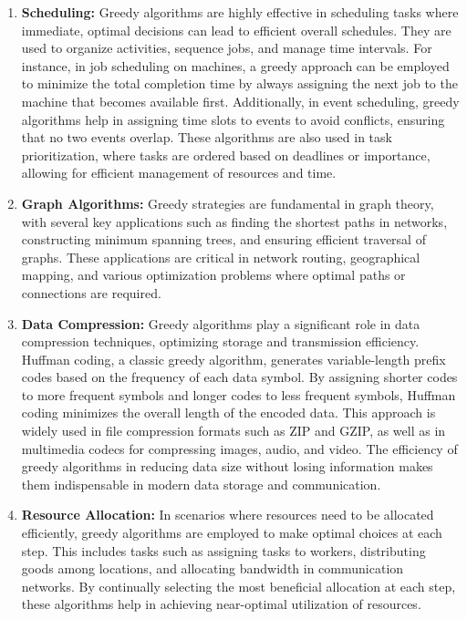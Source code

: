 \documentclass[
]{article}
\begin{document}
    \begin{enumerate}
        \item \textbf{Scheduling:} Greedy algorithms are highly effective in scheduling tasks where immediate, optimal decisions can lead to efficient overall schedules. They are used to organize activities, sequence jobs, and manage time intervals. For instance, in job scheduling on machines, a greedy approach can be employed to minimize the total completion time by always assigning the next job to the machine that becomes available first. Additionally, in event scheduling, greedy algorithms help in assigning time slots to events to avoid conflicts, ensuring that no two events overlap. These algorithms are also used in task prioritization, where tasks are ordered based on deadlines or importance, allowing for efficient management of resources and time.

        \item \textbf{Graph Algorithms:} Greedy strategies are fundamental in graph theory, with several key applications such as finding the shortest paths in networks, constructing minimum spanning trees, and ensuring efficient traversal of graphs. These applications are critical in network routing, geographical mapping, and various optimization problems where optimal paths or connections are required.

        \item \textbf{Data Compression:} Greedy algorithms play a significant role in data compression techniques, optimizing storage and transmission efficiency. Huffman coding, a classic greedy algorithm, generates variable-length prefix codes based on the frequency of each data symbol. By assigning shorter codes to more frequent symbols and longer codes to less frequent symbols, Huffman coding minimizes the overall length of the encoded data. This approach is widely used in file compression formats such as ZIP and GZIP, as well as in multimedia codecs for compressing images, audio, and video. The efficiency of greedy algorithms in reducing data size without losing information makes them indispensable in modern data storage and communication.

        \item \textbf{Resource Allocation:} In scenarios where resources need to be allocated efficiently, greedy algorithms are employed to make optimal choices at each step. This includes tasks such as assigning tasks to workers, distributing goods among locations, and allocating bandwidth in communication networks. By continually selecting the most beneficial allocation at each step, these algorithms help in achieving near-optimal utilization of resources.


\end{enumerate}
\end{document}
